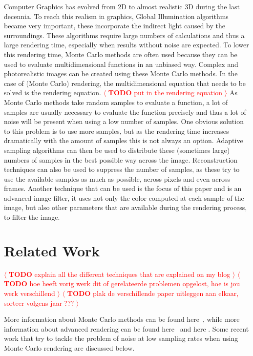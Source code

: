 \documentclass[review]{acmsiggraph}
\newcommand{\todo}[1]{\textcolor{red}{\(\langle\) \textbf{TODO} #1 \(\rangle\) }}
\begin{document}
Computer Graphics has evolved from 2D to almost realistic 3D during the last decennia.
To reach this realism in graphics, Global Illumination algorithms became very important, 
these incorporate the indirect light caused by the surroundings.
These algorithms require large numbers of calculations and thus a large rendering time, especially when results without noise are expected.
To lower this rendering time, Monte Carlo methods are often used because they can be used to evaluate multidimensional functions in an unbiased way.
Complex and photorealistic images can be created using these Monte Carlo methods.
In the case of (Monte Carlo) rendering, the multidimensional equation that needs to be solved is the rendering equation. 
\todo{put in the rendering equation}
As Monte Carlo methods take random samples to evaluate a function, a lot of samples are usually necessary to evaluate the function precisely and 
thus a lot of noise will be present when using a low number of samples. 
One obvious solution to this problem is to use more samples, 
but as the rendering time increases dramatically with the amount of samples this is not always an option.
Adaptive sampling algorithms can then be used to distribute these (sometimes large) numbers of samples in the best possible way across the image.
Reconstruction techniques can also be used to suppress the number of samples, 
as these try to use the available samples as much as possible, across pixels and even across frames.
Another technique that can be used is the focus of this paper and is an advanced image filter, 
it uses not only the color computed at each sample of the image, 
but also other parameters that are available during the rendering process, to filter the image.

\section{Related Work}
\todo{explain all the different techniques that are explained on my blog}
\todo{hoe heeft vorig werk dit of gerelateerde problemen
opgelost, hoe is jou werk verschillend}
\todo{plak de verschillende paper uitleggen aan elkaar, sorteer volgens jaar ???}

More information about Monte Carlo methods can be found here~\cite{kalos2009monte}, 
while more information about advanced rendering can be found here~\cite{dutré2006advanced} and here \cite{pharr2010physically}.
Some recent work that try to tackle the problem of noise at low sampling rates when using Monte Carlo rendering are discussed below.
\end{document}
